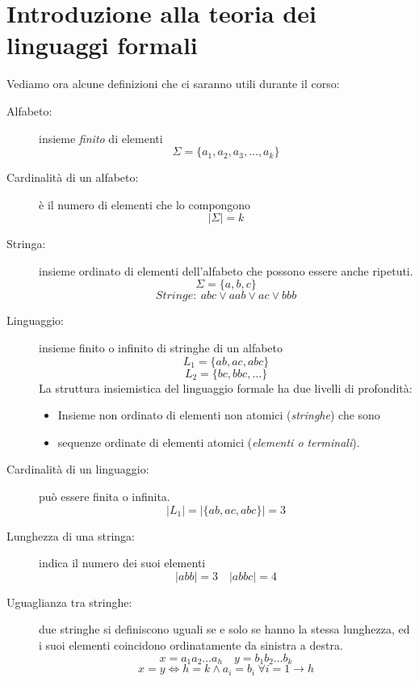 \section{Introduzione alla teoria dei linguaggi formali}
Vediamo ora alcune definizioni che ci saranno utili durante il corso:
\begin{description}
	\item[Alfabeto:] insieme \emph{finito} di elementi
	$$\Sigma = \{a_1, a_2, a_3, \dots, a_k\}$$
	\item[Cardinalità di un alfabeto:]  è il numero di elementi che lo compongono
	$$ |\Sigma| = k $$
	\item[Stringa:] insieme ordinato di elementi dell'alfabeto che possono essere anche ripetuti.
	$$\Sigma = \{a,b,c\}$$
	$$Stringe: \ abc \vee aab \vee ac \vee bbb$$
	\item[Linguaggio:] insieme finito o infinito di stringhe di un alfabeto
	$$L_1 = \{ab,ac,abc\}$$
	$$L_2 = \{bc,bbc,\dots\}$$
	La struttura insiemistica del linguaggio formale ha due livelli di profondità:
	\begin{itemize}
		\item Insieme non ordinato di elementi non atomici (\emph{stringhe}) che sono
		\item sequenze ordinate di elementi atomici (\emph{elementi o terminali}).
	\end{itemize}
	\item[Cardinalità di un linguaggio:] può essere finita o infinita.
	$$|L_1| = |\{ab,ac,abc\}| = 3$$
	\item[Lunghezza di una stringa:] indica il numero dei suoi elementi
	$$|abb| = 3 \quad |abbc| = 4$$
	\item[Uguaglianza tra stringhe:] due stringhe si definiscono uguali se e solo se hanno la stessa lunghezza, ed i suoi elementi coincidono ordinatamente da sinistra a destra.
	$$x = a_1a_2\dots a_h \quad y = b_1b_2\dots b_k$$
	$$x = y \iff h = k \wedge a_i = b_i \ \forall i = 1\to h $$
\end{description}
